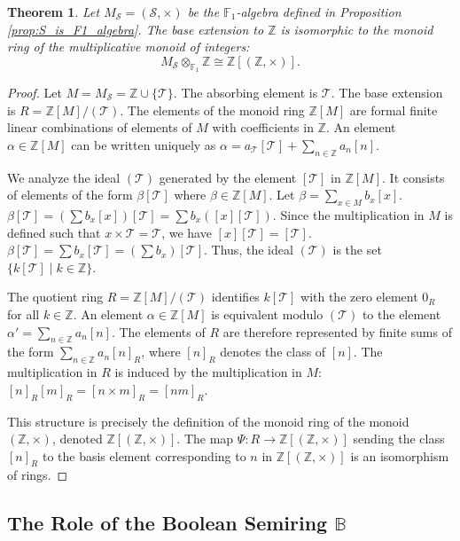 \documentclass[11pt, a4paper]{article}
\theoremstyle{plain}
\newtheorem{theorem}{Theorem}[section]
\theoremstyle{definition}
\numberwithin{equation}{section}
\newcommand{\Z}{\mathbb{Z}}
\newcommand{\Tobj}{\mathcal{T}} %
\newcommand{\SemiringS}{\mathcal{S}}
\newcommand{\Bool}{\mathbb{B}}
\newcommand{\FOne}{\mathbb{F}_1}
\begin{document}
\begin{theorem}\label{thm:base_extension_S}
Let $M_{\SemiringS} = (\SemiringS, \times)$ be the $\FOne$-algebra defined in Proposition \ref{prop:S_is_F1_algebra}. The base extension to $\Z$ is isomorphic to the monoid ring of the multiplicative monoid of integers:
\begin{equation}
    M_{\SemiringS} \otimes_{\FOne} \Z \cong \Z[(\Z, \times)].
\end{equation}
\end{theorem}
\begin{proof}
Let $M = M_{\SemiringS} = \Z \cup \{\Tobj\}$. The absorbing element is $\Tobj$.
The base extension is $R = \Z[M]/(\Tobj)$.
The elements of the monoid ring $\Z[M]$ are formal finite linear combinations of elements of $M$ with coefficients in $\Z$. An element $\alpha \in \Z[M]$ can be written uniquely as $\alpha = a_{\Tobj} [\Tobj] + \sum_{n \in \Z} a_n [n]$.

We analyze the ideal $(\Tobj)$ generated by the element $[\Tobj]$ in $\Z[M]$.
It consists of elements of the form $\beta [\Tobj]$ where $\beta \in \Z[M]$.
Let $\beta = \sum_{x \in M} b_x [x]$.
$\beta [\Tobj] = (\sum b_x [x]) [\Tobj] = \sum b_x ([x][\Tobj])$.
Since the multiplication in $M$ is defined such that $x\times\Tobj = \Tobj$, we have $[x][\Tobj]=[\Tobj]$.
$\beta [\Tobj] = \sum b_x [\Tobj] = (\sum b_x) [\Tobj]$.
Thus, the ideal $(\Tobj)$ is the set $\{ k[\Tobj] \mid k \in \Z\}$.

The quotient ring $R = \Z[M]/(\Tobj)$ identifies $k[\Tobj]$ with the zero element $0_R$ for all $k \in \Z$.
An element $\alpha \in \Z[M]$ is equivalent modulo $(\Tobj)$ to the element $\alpha' = \sum_{n \in \Z} a_n [n]$.
The elements of $R$ are therefore represented by finite sums of the form $\sum_{n \in \Z} a_n [n]_R$, where $[n]_R$ denotes the class of $[n]$.
The multiplication in $R$ is induced by the multiplication in $M$: $[n]_R [m]_R = [n\times m]_R = [nm]_R$.

This structure is precisely the definition of the monoid ring of the monoid $(\Z, \times)$, denoted $\Z[(\Z, \times)]$.
The map $\Psi: R \to \Z[(\Z, \times)]$ sending the class $[n]_R$ to the basis element corresponding to $n$ in $\Z[(\Z, \times)]$ is an isomorphism of rings.
\end{proof}

\subsection{The Role of the Boolean Semiring \texorpdfstring{$\Bool$}{B}}
\end{document}
